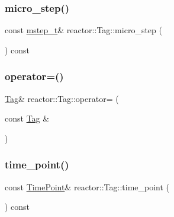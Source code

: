 \mbox{\label{classreactor_1_1Tag_a8cfdeeb03c2e48a684e1bc517505c087}} 
\subsubsection{\texorpdfstring{micro\+\_\+step()}{micro\_step()}}
{\footnotesize\ttfamily const \hyperlink{namespacereactor_aaea1189d617982457b74127ba74a7340}{mstep\+\_\+t}\& reactor\+::\+Tag\+::micro\+\_\+step (\begin{DoxyParamCaption}{ }\end{DoxyParamCaption}) const\hspace{0.3cm}{\ttfamily [inline]}}

\mbox{\label{classreactor_1_1Tag_ae0776e16fba93c8836ab0d1651ffd309}} 
\subsubsection{\texorpdfstring{operator=()}{operator=()}}
{\footnotesize\ttfamily \hyperlink{classreactor_1_1Tag}{Tag}\& reactor\+::\+Tag\+::operator= (\begin{DoxyParamCaption}\item[{const \hyperlink{classreactor_1_1Tag}{Tag} \&}]{ }\end{DoxyParamCaption})\hspace{0.3cm}{\ttfamily [delete]}}

\mbox{\label{classreactor_1_1Tag_a25ec5662af4fc8c9b34cf5cc0d70b569}} 
\subsubsection{\texorpdfstring{time\+\_\+point()}{time\_point()}}
{\footnotesize\ttfamily const \hyperlink{namespacereactor_ad950f8d1a46612500286a4af0f167080}{Time\+Point}\& reactor\+::\+Tag\+::time\+\_\+point (\begin{DoxyParamCaption}{ }\end{DoxyParamCaption}) const\hspace{0.3cm}{\ttfamily [inline]}}



